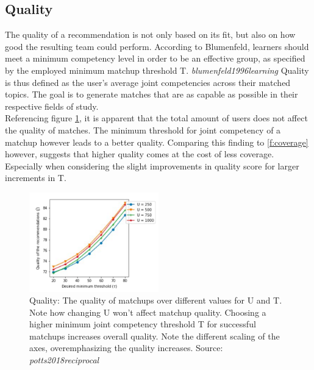 \documentclass[nochapterpage,bigchapter,linedtoc,longdoc,colorback,accentcolor=tud3b,oneside]{tudreport}
\begin{document}
\subsection{Quality} \label{paper:quality}
The quality of a recommendation is not only based on its fit, but also on how good the resulting team could perform. According to Blumenfeld, learners should meet a minimum competency level in order to be an effective group, as specified by the employed minimum matchup threshold T. \textit{blumenfeld1996learning} Quality is thus defined as the user's average joint competencies across their matched topics. The goal is to generate matches that are as capable as possible in their respective fields of study.\\
Referencing figure \ref{f:quality}, it is apparent that the total amount of users does not affect the quality of matches. The minimum threshold for joint competency of a matchup however leads to a better quality. Comparing this finding to \ref{f:coverage} however, suggests that higher quality comes at the cost of less coverage. Especially when considering the slight improvements in quality score for larger increments in T.\\
\begin{figure}[p]
	\centering
	\includegraphics[width=0.5\textwidth]{g/QualityByU.PNG}
	\caption{Quality: The quality of matchups over different values for U and T. Note how changing U won't affect matchup quality. Choosing a higher minimum joint competency threshold T for successful matchups increases overall quality. Note the different scaling of the axes, overemphasizing the quality increases. Source: \textit{potts2018reciprocal}}
	\label{f:quality}
\end{figure}
\end{document}
